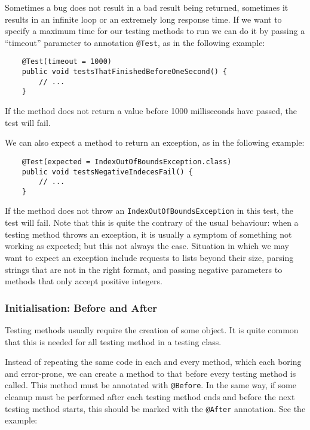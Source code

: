 Sometimes a bug does not result in a bad result being returned,
sometimes it results in an infinite loop or an extremely long response
time. If we want to specify a maximum time for our testing methods to
run we can do it by passing a ``timeout'' parameter to annotation
\verb+@Test+, as in the following example: 

\begin{verbatim}
    @Test(timeout = 1000)  
    public void testsThatFinishedBeforeOneSecond() {  
        // ...
    }  
\end{verbatim}

If the method does not return a value before 1000 milliseconds have
passed, the test will fail. 

We can also expect a method to return an exception, as in the
following example: 

\begin{verbatim}
    @Test(expected = IndexOutOfBoundsException.class)
    public void testsNegativeIndecesFail() {  
        // ...
    }  
\end{verbatim}

If the method does not throw an \verb+IndexOutOfBoundsException+ in
this test, the test will fail. Note that this is quite the contrary of
the usual behaviour: when a testing method throws an exception, it is
usually a symptom of something not working as expected; but this not
always the case. Situation in which we may want to expect an exception
include requests to lists beyond their size, parsing strings that
are not in the right format, and passing negative parameters to
methods that only accept positive integers. 

\subsubsection*{Initialisation: Before and After}
\label{sec:init-before-after}

Testing methods usually require the creation of some object. It is
quite common that this is needed for all testing method in a testing
class. 

Instead of repeating the same code in each and every method, which
each boring and error-prone, we can create a method to that before
every testing method is called. This method must be annotated with
\verb+@Before+. In the same way, if some cleanup must be performed
after each testing method ends and before the next testing method
starts, this should be marked with the \verb+@After+ annotation. See
the example: 

